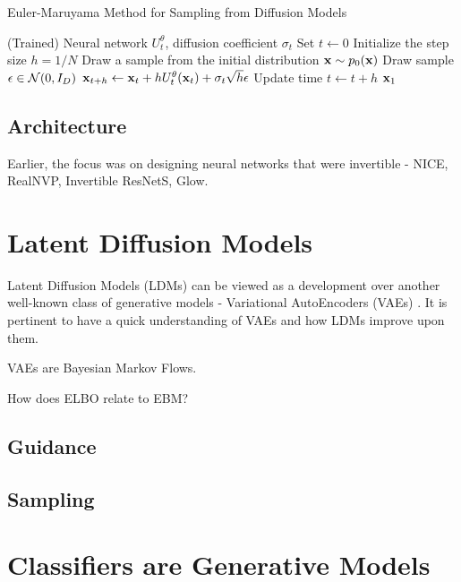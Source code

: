 \documentclass[a4paper, 11pt]{article}
\begin{document}
\begin{algorithm}
    \caption{Euler-Maruyama Method for Sampling from Diffusion Models}\label{alg:diff_sample}
    \begin{algorithmic}[1]
    \Require (Trained) Neural network $U_t^{\theta}$, diffusion coefficient $\sigma_t$
    \State Set $t \gets 0$
    \State Initialize the step size $h = 1 / N$
    \State Draw a sample from the initial distribution $\mbox{$\mbox{$\mathbf{x}$}$} \sim p_0(\mbox{$\mbox{$\mathbf{x}$}$})$
    \State Draw sample $\epsilon \in \mbox{$\cal N$}(0, I_D)$
    \State $\mbox{$\mbox{$\mathbf{x}$}$}_{t+h} \gets \mbox{$\mbox{$\mathbf{x}$}$}_t + h U_t^{\theta}(\mbox{$\mbox{$\mathbf{x}$}$}_t) + \sigma_t \sqrt{h}\epsilon$
    \State Update time $t \gets t + h$
    \EndFor
    \State \Return $\mbox{$\mbox{$\mathbf{x}$}$}_1$
    \end{algorithmic}
\end{algorithm}


\subsection{Architecture}
Earlier, the focus was on designing neural networks that were invertible - NICE, RealNVP, Invertible ResNetS, Glow.

\section{Latent Diffusion Models}

Latent Diffusion Models (LDMs) can be viewed as a development over another well-known class of generative models - Variational AutoEncoders (VAEs) \cite{dieleman2023perspectives}. It is pertinent to have a quick understanding of VAEs and how LDMs improve upon them.

VAEs are Bayesian Markov Flows.

How does ELBO relate to EBM? 



\subsection{Guidance}

\subsection{Sampling}


\section{Classifiers are Generative Models}
\end{document}
